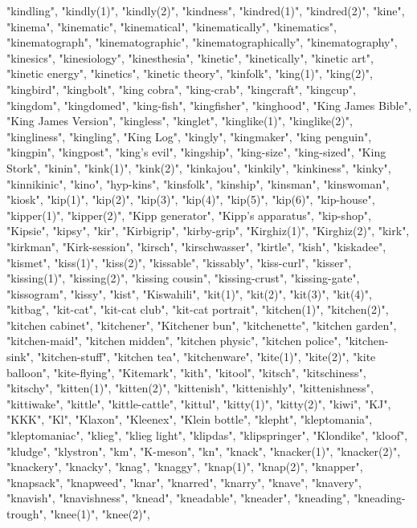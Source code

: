 "kindling",
"kindly(1)",
"kindly(2)",
"kindness",
"kindred(1)",
"kindred(2)",
"kine",
"kinema",
"kinematic",
"kinematical",
"kinematically",
"kinematics",
"kinematograph",
"kinematographic",
"kinematographically",
"kinematography",
"kinesics",
"kinesiology",
"kinesthesia",
"kinetic",
"kinetically",
"kinetic art",
"kinetic energy",
"kinetics",
"kinetic theory",
"kinfolk",
"king(1)",
"king(2)",
"kingbird",
"kingbolt",
"king cobra",
"king-crab",
"kingcraft",
"kingcup",
"kingdom",
"kingdomed",
"king-fish",
"kingfisher",
"kinghood",
"King James Bible",
"King James Version",
"kingless",
"kinglet",
"kinglike(1)",
"kinglike(2)",
"kingliness",
"kingling",
"King Log",
"kingly",
"kingmaker",
"king penguin",
"kingpin",
"kingpost",
"king's evil",
"kingship",
"king-size",
"king-sized",
"King Stork",
"kinin",
"kink(1)",
"kink(2)",
"kinkajou",
"kinkily",
"kinkiness",
"kinky",
"kinnikinic",
"kino",
"hyp-kins",
"kinsfolk",
"kinship",
"kinsman",
"kinswoman",
"kiosk",
"kip(1)",
"kip(2)",
"kip(3)",
"kip(4)",
"kip(5)",
"kip(6)",
"kip-house",
"kipper(1)",
"kipper(2)",
"Kipp generator",
"Kipp's apparatus",
"kip-shop",
"Kipsie",
"kipsy",
"kir",
"Kirbigrip",
"kirby-grip",
"Kirghiz(1)",
"Kirghiz(2)",
"kirk",
"kirkman",
"Kirk-session",
"kirsch",
"kirschwasser",
"kirtle",
"kish",
"kiskadee",
"kismet",
"kiss(1)",
"kiss(2)",
"kissable",
"kissably",
"kiss-curl",
"kisser",
"kissing(1)",
"kissing(2)",
"kissing cousin",
"kissing-crust",
"kissing-gate",
"kissogram",
"kissy",
"kist",
"Kiswahili",
"kit(1)",
"kit(2)",
"kit(3)",
"kit(4)",
"kitbag",
"kit-cat",
"kit-cat club",
"kit-cat portrait",
"kitchen(1)",
"kitchen(2)",
"kitchen cabinet",
"kitchener",
"Kitchener bun",
"kitchenette",
"kitchen garden",
"kitchen-maid",
"kitchen midden",
"kitchen physic",
"kitchen police",
"kitchen-sink",
"kitchen-stuff",
"kitchen tea",
"kitchenware",
"kite(1)",
"kite(2)",
"kite balloon",
"kite-flying",
"Kitemark",
"kith",
"kitool",
"kitsch",
"kitschiness",
"kitschy",
"kitten(1)",
"kitten(2)",
"kittenish",
"kittenishly",
"kittenishness",
"kittiwake",
"kittle",
"kittle-cattle",
"kittul",
"kitty(1)",
"kitty(2)",
"kiwi",
"KJ",
"KKK",
"Kl",
"Klaxon",
"Kleenex",
"Klein bottle",
"klepht",
"kleptomania",
"kleptomaniac",
"klieg",
"klieg light",
"klipdas",
"klipspringer",
"Klondike",
"kloof",
"kludge",
"klystron",
"km",
"K-meson",
"kn",
"knack",
"knacker(1)",
"knacker(2)",
"knackery",
"knacky",
"knag",
"knaggy",
"knap(1)",
"knap(2)",
"knapper",
"knapsack",
"knapweed",
"knar",
"knarred",
"knarry",
"knave",
"knavery",
"knavish",
"knavishness",
"knead",
"kneadable",
"kneader",
"kneading",
"kneading-trough",
"knee(1)",
"knee(2)",
